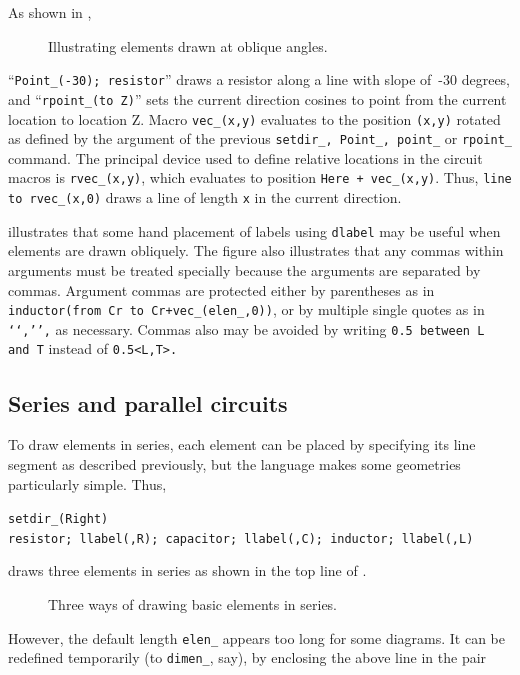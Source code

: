 As shown in ,
\begin{figure}[h!t]
\vspace{-\baselineskip}
   \parbox{4.5in}{\small }%
   \hfill\raise-0.7in\llap{\hbox{ }}%
   \vspace{-\baselineskip}
   \caption{Illustrating elements drawn at oblique angles.}
   \label{Oblique}
   \end{figure}
``{\tt Point\_(-30); resistor}'' draws a resistor
along a line with slope of~-30 degrees, and ``{\tt rpoint\_(to Z)}'' sets
the current direction cosines to point from the current location to location Z.
Macro {\tt vec\_(x,y)}
evaluates to the position {\tt (x,y)} rotated as defined by the
argument of the previous
{\tt setdir\_, Point\_, point\_} or {\tt rpoint\_} command.
The principal device used to define relative locations in the circuit macros
is {\tt rvec\_(x,y)}, which evaluates to position {\tt Here + vec\_(x,y)}.
Thus, {\tt line to rvec\_(x,0)} draws a line of length {\tt x} in the current
direction.

 illustrates that some hand placement of labels
using {\tt dlabel} may be useful when elements are drawn obliquely.
The figure also illustrates that any commas within \Mfour arguments must
be treated specially because the arguments are separated by commas.
Argument commas are protected either by parentheses as in
{\tt inductor(from Cr to Cr+vec\_(elen\_,0))}, or by multiple single quotes
as in {\tt `{`,'}',} as necessary.
Commas also may be avoided by writing
{\tt 0.5 between L and T} instead of {\tt 0.5<L,T>.}

\subsection{Series and parallel circuits\label{Seriesandparallel:}}

To draw elements in series, each element can be placed by specifying
its line segment as described previously, but the \pic language
makes some geometries particularly simple.  Thus,

{\tt setdir\_(Right)\\ \hspace*{\parindent}%
  resistor; llabel(,R); capacitor; llabel(,C);
  inductor; llabel(,L)}

\noindent
draws three elements in series
as shown in the top line of .
\begin{figure}[ht]
\vspace{-\baselineskip}
   
   \caption{Three ways of drawing basic elements in series.}
   \label{Series}
   \end{figure}
However, the default length {\tt elen\_}
appears too long for some diagrams.  It can be redefined temporarily
(to {\tt dimen\_}, say),
by enclosing the above line in the pair

